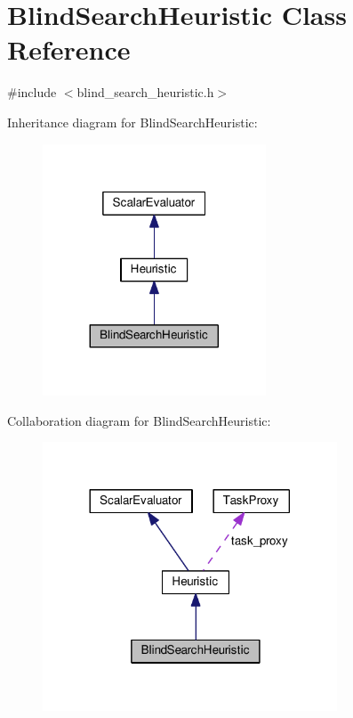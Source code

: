 \hypertarget{classBlindSearchHeuristic}{\section{Blind\-Search\-Heuristic Class Reference}
\label{classBlindSearchHeuristic}
}


{\ttfamily \#include $<$blind\-\_\-search\-\_\-heuristic.\-h$>$}



Inheritance diagram for Blind\-Search\-Heuristic\-:
\nopagebreak
\begin{figure}[H]
\begin{center}
\leavevmode
\includegraphics[width=188pt]{classBlindSearchHeuristic__inherit__graph}
\end{center}
\end{figure}


Collaboration diagram for Blind\-Search\-Heuristic\-:
\nopagebreak
\begin{figure}[H]
\begin{center}
\leavevmode
\includegraphics[width=248pt]{classBlindSearchHeuristic__coll__graph}
\end{center}
\end{figure}
